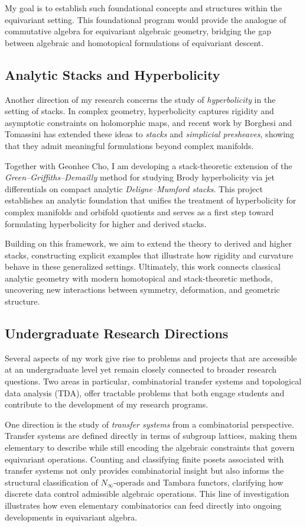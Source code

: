 \documentclass[11pt]{article}
\begin{document}
My goal is to establish such foundational concepts and structures within the equivariant setting.
This foundational program would provide the analogue of commutative algebra for equivariant algebraic geometry, bridging the gap between algebraic and homotopical formulations of equivariant descent.

\subsection*{Analytic Stacks and Hyperbolicity}
Another direction of my research concerns the study of {\it hyperbolicity} in the setting of stacks.
In complex geometry, hyperbolicity captures rigidity and asymptotic constraints on holomorphic maps, and recent work by Borghesi and Tomassini \cite{MR3673667} has extended these ideas to {\it stacks} and {\it simplicial presheaves}, showing that they admit meaningful formulations beyond complex manifolds.

Together with Geonhee Cho, I am developing a stack-theoretic extension of the {\it Green–Griffiths–Demailly} method for studying Brody hyperbolicity via jet differentials on compact analytic {\it Deligne–Mumford stacks}.
This project establishes an analytic foundation that unifies the treatment of hyperbolicity for complex manifolds and orbifold quotients and serves as a first step toward formulating hyperbolicity for higher and derived stacks.

Building on this framework, we aim to extend the theory to derived and higher stacks, constructing explicit examples that illustrate how rigidity and curvature behave in these generalized settings.
Ultimately, this work connects classical analytic geometry with modern homotopical and stack-theoretic methods, uncovering new interactions between symmetry, deformation, and geometric structure.

\subsection*{Undergraduate Research Directions}
Several aspects of my work give rise to problems and projects that are accessible at an undergraduate level yet remain closely connected to broader research questions.
Two areas in particular, combinatorial transfer systems and topological data analysis (TDA), offer tractable problems that both engage students and contribute to the development of my research programs.

One direction is the study of {\it transfer systems} from a combinatorial perspective.
Transfer systems are defined directly in terms of subgroup lattices, making them elementary to describe while still encoding the algebraic constraints that govern equivariant operations.
Counting and classifying finite posets associated with transfer systems not only provides combinatorial insight but also informs the structural classification of $N_\infty$-operads and Tambara functors, clarifying how discrete data control admissible algebraic operations.
This line of investigation illustrates how even elementary combinatorics can feed directly into ongoing developments in equivariant algebra.
\end{document}
